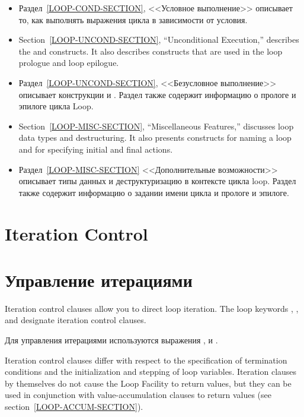 \begin{itemize}
\item Раздел~\ref{LOOP-COND-SECTION}, <<Условное выполнение>>
  описывает то, как выполнять выражения цикла в зависимости от
  условия.

\item Section~\ref{LOOP-UNCOND-SECTION}, ``Unconditional Execution,''
  describes the  and  constructs.  It also
  describes constructs that are used in the loop prologue and loop
  epilogue.

\item Раздел~\ref{LOOP-UNCOND-SECTION}, <<Безусловное выполнение>>
  описывает конструкции  и . Раздел также содержит
  информацию о прологе и эпилоге цикла Loop.

\item Section~\ref{LOOP-MISC-SECTION}, ``Miscellaneous Features,''
  discusses loop data types and destructuring.  It also presents
  constructs for naming a loop and for specifying initial and final
  actions.

\item Раздел~\ref{LOOP-MISC-SECTION} <<Дополнительные возможности>>
  описывает типы данных и деструктуризацию в контексте цикла
  loop. Раздел также содержит информацию о задании имени цикла и
  прологе и эпилоге.
\end{itemize}


\section{Iteration Control}
\label{LOOP-ITERATION-SECTION}

\section{Управление итерациями}
\label{LOOP-ITERATION-SECTION}

Iteration control clauses allow you to direct loop iteration.  The
loop keywords , , and  designate iteration control clauses.

Для управления итерациями используются выражения ,  и .

Iteration control clauses differ with respect to the specification of
termination conditions and the initialization and stepping
of loop variables.  Iteration clauses by themselves
do not cause the Loop Facility to return values, but they
can be used in conjunction with value-accumulation clauses to
return values (see section~\ref{LOOP-ACCUM-SECTION}).

